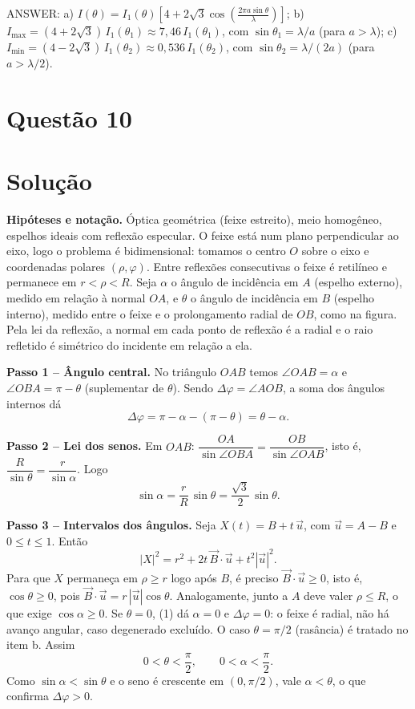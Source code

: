\documentclass{article}%
\begin{document}
ANSWER: a) $I(\theta)=I_1(\theta)\left[4+2\sqrt{3}\cos\left(\frac{2\pi a\sin\theta}{\lambda}\right)\right]$; b) $I_{\max}=(4+2\sqrt{3})\,I_1(\theta_1)\approx 7{,}46\,I_1(\theta_1)$, com $\sin\theta_1=\lambda/a$ (para $a>\lambda$); c) $I_{\min}=(4-2\sqrt{3})\,I_1(\theta_2)\approx 0{,}536\,I_1(\theta_2)$, com $\sin\theta_2=\lambda/(2a)$ (para $a>\lambda/2$).%
\newpage%
\section*{Questão 10}

\section*{Solução}

\textbf{Hipóteses e notação.} Óptica geométrica (feixe estreito), meio homogêneo, espelhos ideais com reflexão especular. O feixe está num plano perpendicular ao eixo, logo o problema é bidimensional: tomamos o centro $O$ sobre o eixo e coordenadas polares $(\rho,\varphi)$. Entre reflexões consecutivas o feixe é retilíneo e permanece em $r<\rho<R$. Seja $\alpha$ o ângulo de incidência em $A$ (espelho externo), medido em relação à normal $OA$, e $\theta$ o ângulo de incidência em $B$ (espelho interno), medido entre o feixe e o prolongamento radial de $OB$, como na figura. Pela lei da reflexão, a normal em cada ponto de reflexão é a radial e o raio refletido é simétrico do incidente em relação a ela.

\textbf{Passo 1 -- Ângulo central.} No triângulo $OAB$ temos $\angle OAB=\alpha$ e $\angle OBA=\pi-\theta$ (suplementar de $\theta$). Sendo $\Delta\varphi=\angle AOB$, a soma dos ângulos internos dá
\[
\Delta\varphi=\pi-\alpha-(\pi-\theta)=\theta-\alpha .
\]

\textbf{Passo 2 -- Lei dos senos.} Em $OAB$: $\dfrac{OA}{\sin\angle OBA}=\dfrac{OB}{\sin\angle OAB}$, isto é, $\dfrac{R}{\sin\theta}=\dfrac{r}{\sin\alpha}$. Logo
\[
\sin\alpha=\frac{r}{R}\,\sin\theta=\frac{\sqrt{3}}{2}\,\sin\theta . \tag{1}
\]

\textbf{Passo 3 -- Intervalos dos ângulos.} Seja $X(t)=B+t\,\vec u$, com $\vec u=A-B$ e $0\le t\le 1$. Então
\[
|X|^2=r^2+2t\,\vec B\cdot\vec u+t^2|\vec u|^2 .
\]
Para que $X$ permaneça em $\rho\ge r$ logo após $B$, é preciso $\vec B\cdot\vec u\ge 0$, isto é, $\cos\theta\ge 0$, pois $\vec B\cdot\vec u=r\,|\vec u|\cos\theta$. Analogamente, junto a $A$ deve valer $\rho\le R$, o que exige $\cos\alpha\ge 0$. Se $\theta=0$, (1) dá $\alpha=0$ e $\Delta\varphi=0$: o feixe é radial, não há avanço angular, caso degenerado excluído. O caso $\theta=\pi/2$ (rasância) é tratado no item b. Assim
\[
0<\theta<\frac{\pi}{2},\qquad 0<\alpha<\frac{\pi}{2}.
\]
Como $\sin\alpha<\sin\theta$ e o seno é crescente em $(0,\pi/2)$, vale $\alpha<\theta$, o que confirma $\Delta\varphi>0$.
\end{document}
